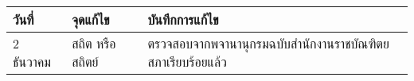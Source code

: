 
\begin{table}[ht!]
    \center
    \begin{tabularx}{\textwidth}{|l|l|X|}
        \hline
        \rowcolor{LightGray}
        {\bf วันที่}   & {\bf จุดแก้ไข}          & {\bf บันทึกการแก้ไข} \\ \hline
        2 ธันวาคม    & สถิต หรือ สถิตย์          & ตรวจสอบจากพจานานุกรมฉบับสำนักงานราชบัณฑิตยสภาเรียบร้อยแล้ว \\ \hline
    \end{tabularx}
\end{table}
